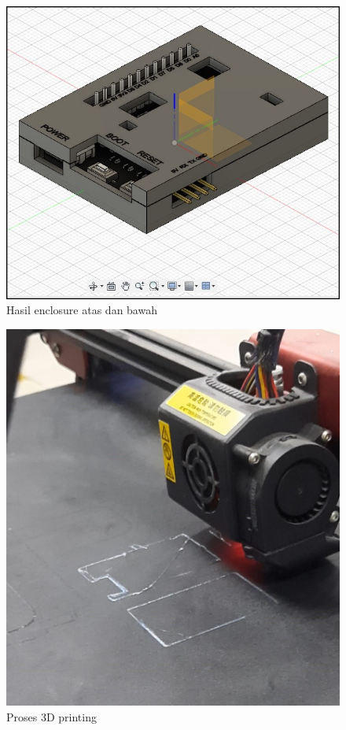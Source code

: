 \begin{figure}[H]
  \centering
  \includegraphics[width=0.6\linewidth]{img/modul_3/enclosure_full_withcomponent.jpg}
  \caption{Hasil enclosure atas dan bawah \label{fig:inisub1}}
\end{figure}

\begin{figure}[H]
  \centering
  \includegraphics[width=0.6\linewidth]{img/modul_3/proses_3d_printing.jpg}
  \caption{Proses 3D printing \label{fig:inisub1}}
\end{figure}